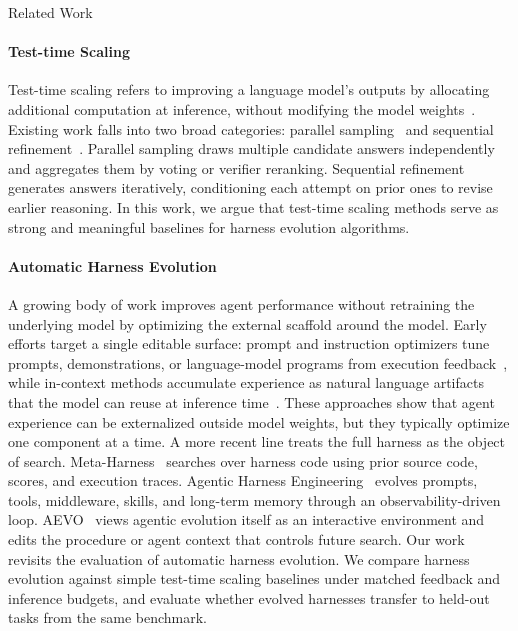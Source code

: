 \documentclass{article}
\begin{document}
\begin{section}{Related Work}\label{sec:related}

\paragraph{Test-time Scaling}
Test-time scaling refers to improving a language model's outputs by allocating additional computation at inference, without modifying the model weights~\citep{snell2024scaling}. Existing work falls into two broad categories: parallel sampling~\citep{wang2022self, brown2024large} and sequential refinement~\citep{madaan2023self}. Parallel sampling draws multiple candidate answers independently and aggregates them by voting or verifier reranking. Sequential refinement generates answers iteratively, conditioning each attempt on prior ones to revise earlier reasoning. 
In this work, we argue that test-time scaling methods serve as strong and meaningful baselines for harness evolution algorithms.

\paragraph{Automatic Harness Evolution}
A growing body of work improves agent performance without retraining the underlying model by optimizing the external scaffold around the model. Early efforts target a single editable surface: prompt and instruction optimizers tune prompts, demonstrations, or language-model programs from execution feedback~\citep{khattab2023dspy, opsahl2024optimizing, yuksekgonul2025optimizing, agrawal2025gepa}, while in-context methods accumulate experience as natural language artifacts that the model can reuse at inference time~\citep{zhao2024expel, zhang2025agentic}. These approaches show that agent experience can be externalized outside model weights, but they typically optimize one component at a time. A more recent line treats the full harness as the object of search. Meta-Harness~\citep{leeMetaHarnessEndtoEndOptimization2026} searches over harness code using prior source code, scores, and execution traces. Agentic Harness Engineering~\citep{lin2026agentic} evolves prompts, tools, middleware, skills, and long-term memory through an observability-driven loop. AEVO~\citep{zhang2026harnessing} views agentic evolution itself as an interactive environment and edits the procedure or agent context that controls future search. Our work revisits the evaluation of automatic harness evolution. We compare harness evolution against simple test-time scaling baselines under matched feedback and inference budgets, and evaluate whether evolved harnesses transfer to held-out tasks from the same benchmark.

\end{section}
\end{document}
